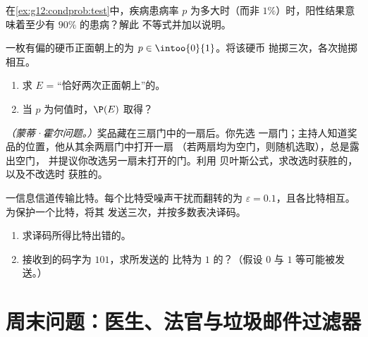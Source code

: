 \begin{exercise}[$\star\star$]\label{exo:g12:condprob:5}
在\cref{ex:g12:condprob:test}中，疾病患病率 $p$ 为多大时（而非
$1\%$）时，阳性结果意味着至少有 $90\%$ 的患病？解此
不等式并加以说明。
\end{exercise}

\begin{exercise}[$\star\star$]\label{exo:g12:condprob:6}
一枚有偏的硬币正面朝上的为 $p \in \intoo{0}{1}$。将该硬币
抛掷三次，各次抛掷相互。
\begin{enumerate}
  \item 求 $E$ = “恰好两次正面朝上”的。
  \item 当 $p$ 为何值时，$\P(E)$ 取得？
\end{enumerate}
\end{exercise}

\begin{exercise}[$\star\star\star$]\label{exo:g12:condprob:7}
\emph{（蒙蒂·霍尔问题。）}奖品藏在三扇门中的一扇后。你先选
一扇门；主持人知道奖品的位置，他从其余两扇门中打开一扇
（若两扇均为空门，则随机选取），总是露出空门，
并提议你改选另一扇未打开的门。利用
贝叶斯公式，求改选时获胜的，以及不改选时
获胜的。
\end{exercise}

\begin{exercise}[$\star\star\star$]\label{exo:g12:condprob:8}
一信息信道传输比特。每个比特受噪声干扰而翻转的为
$\varepsilon = 0.1$，且各比特相互。为保护一个比特，将其
发送三次，并按多数表决译码。
\begin{enumerate}
  \item 求译码所得比特出错的。
  \item 接收到的码字为 $101$，求所发送的
        比特为 $1$ 的？（假设 $0$ 与 $1$ 等可能被发送。）
\end{enumerate}
\end{exercise}

\section{周末问题：医生、法官与垃圾邮件过滤器}

